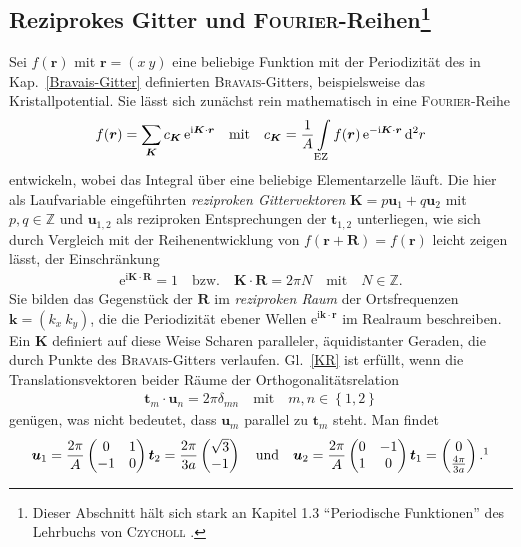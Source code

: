 \documentclass[a4paper, 10pt, twoside, openany]{book} %
\newcommand \braces[1]{\left \lbrace #1 \right \rbrace}
\def \I {\mathrm i}
\def \E {\mathrm e}
\def \D {\mathrm d}
\def \vec {\boldsymbol}
\newcommand \mat[1]{\begin{pmatrix} #1 \end{pmatrix}}
\begin{document}
	\subsection[Reziprokes Gitter und \textsc{Fourier}-Reihen]{Reziprokes Gitter und \textsc{Fourier}-Reihen\footnote{Dieser Abschnitt hält sich stark an Kapitel 1.3 "`Periodische Funktionen"' des Lehrbuchs von \textsc{Czycholl} \cite[S.~18f]{Czycholl}.}}
	
	Sei $f(\vec r)$ mit $\vec r = (x \ y)$ eine beliebige Funktion mit der Periodizität des in Kap.~\ref{Bravais-Gitter} definierten \textsc{Bravais}-Gitters, beispielsweise das Kristallpotential. Sie lässt sich zunächst rein mathematisch in eine \textsc{Fourier}-Reihe
	\begin{align*}
		f(\vec r) = \sum_{\vec K} c_{\vec K} \, \E^{\I \vec K \cdot \vec r} \quad \text{mit} \quad c_{\vec K} = \frac 1 A \int \limits_{\rm EZ} f(\vec r) \, \E^{-\I \vec K \cdot \vec r} \, \D^2 r
	\end{align*}
	entwickeln, wobei das Integral über eine beliebige Elementarzelle läuft. Die hier als Laufvariable eingeführten \emph{reziproken Gittervektoren} $\vec K = p \vec u_1 + q \vec u_2$ mit $p, q \in \mathbb Z$ und $\vec u_{1, 2}$ als reziproken Entsprechungen der $\vec t_{1, 2}$ unterliegen, wie sich durch Vergleich mit der Reihenentwicklung von $f(\vec r + \vec R) = f(\vec r)$ leicht zeigen lässt, der Einschränkung
	\begin{align}
		\E^{\I \vec K \cdot \vec R} = 1 \quad \text{bzw.} \quad \vec K \cdot \vec R = 2 \pi N \quad \text{mit} \quad N \in \mathbb Z.
		\label{KR}
	\end{align}
	Sie bilden das Gegenstück der $\vec R$ im \emph{reziproken Raum} der Ortsfrequenzen $\vec k = (k_x \ k_y)$, die die Periodizität ebener Wellen $\E^{\I \vec k \cdot \vec r}$ im Realraum beschreiben. Ein $\vec K$ definiert auf diese Weise Scharen paralleler, äquidistanter Geraden, die durch Punkte des \textsc{Bravais}-Gitters verlaufen. Gl.~\ref{KR} ist erfüllt, wenn die Translationsvektoren beider Räume der Orthogonalitätsrelation
	\begin{align}
		\vec t_m \cdot \vec u_n = 2 \pi \delta_{m n} \quad \text{mit} \quad m, n \in \braces{1, 2}
		\label{orthogonale tl}
	\end{align}
	genügen, was nicht bedeutet, dass $\vec u_m$ parallel zu $\vec t_m$ steht. Man findet
	\begin{align*}
		\vec u_1 = \frac {2 \pi} A \mat{0 & 1 \\ -1 & 0} \vec t_2 = \frac{2 \pi}{3 a} \mat{\sqrt 3 \\ -1} \quad \text{und} \quad \vec u_2 = \frac {2 \pi} A \mat{0 & -1 \\ 1 & 0} \vec t_1 = \mat{0 \\ \frac{4 \pi}{3 a}}.\footnotemark
	\end{align*}
\end{document}
